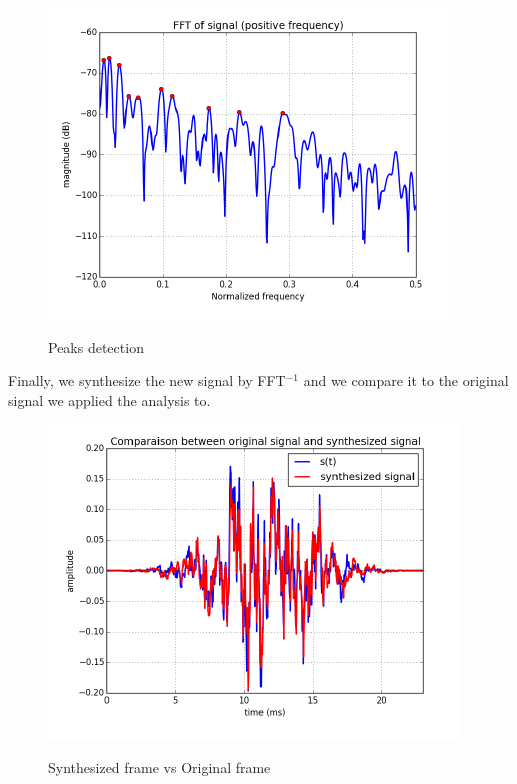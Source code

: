 \documentclass[]{article}
\begin{document}
\begin{figure} [H]
	\centering
	{\includegraphics[scale=0.7]{slide2.png}}
	\caption{Peaks detection}
\end{figure}
\medskip
Finally, we synthesize the new signal by FFT$^{-1}$ and we compare it to the original signal we applied the analysis to.

\begin{figure}[H]
	\centering
	{\includegraphics[scale=0.7]{synthesisstep.png}}
	\caption{Synthesized frame vs Original frame}
\end{figure}
\end{document}
